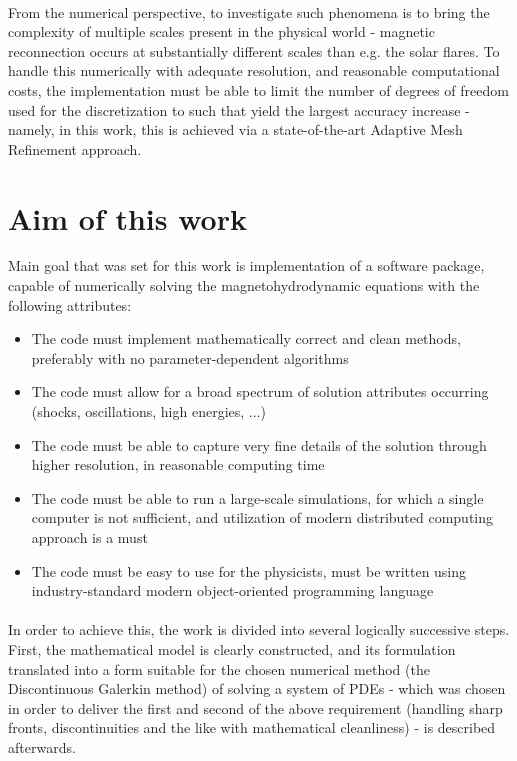 \paragraph{}
From the numerical perspective, to investigate such phenomena is to bring the complexity of multiple scales present in the physical world - magnetic reconnection occurs at substantially different scales than e.g. the solar flares. To handle this numerically with adequate resolution, and reasonable computational costs, the implementation must be able to limit the number of degrees of freedom used for the discretization to such that yield the largest accuracy increase - namely, in this work, this is achieved via a state-of-the-art Adaptive Mesh Refinement approach.

\section{Aim of this work}
Main goal that was set for this work is implementation of a software package, capable of numerically solving the magnetohydrodynamic equations with the following attributes:
\begin{itemize}
	\item The code must implement mathematically correct and clean methods, preferably with no parameter-dependent algorithms
	\item The code must allow for a broad spectrum of solution attributes occurring (shocks, oscillations, high energies, ...)
	\item The code must be able to capture very fine details of the solution through higher resolution, in reasonable computing time
	\item The code must be able to run a large-scale simulations, for which a single computer is not sufficient, and utilization of modern distributed computing approach is a must
	\item The code must be easy to use for the physicists, must be written using industry-standard modern object-oriented programming language
\end{itemize}
\paragraph{}
In order to achieve this, the work is divided into several logically successive steps. First, the mathematical model is clearly constructed, and its formulation translated into a form suitable for the chosen numerical method (the Discontinuous Galerkin method) of solving a system of PDEs - which was chosen in order to deliver the first and second of the above requirement (handling sharp fronts, discontinuities and the like with mathematical cleanliness) - is described afterwards.
